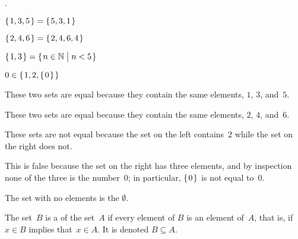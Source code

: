 \documentclass{ibl}
\begin{document}
\begin{ex} \pord.
\begin{exes}
\item $\mbox{$\{\hspace{0.1em}1,3,5\hspace{0.1em}\}$}=\mbox{$\{\hspace{0.1em}5,3,1\hspace{0.1em}\}$}$    
\item $\mbox{$\{\hspace{0.1em}2, 4, 6\hspace{0.1em}\}$}=\mbox{$\{\hspace{0.1em}2, 4, 6, 4\hspace{0.1em}\}$}$    
\item $\mbox{$\{\hspace{0.1em}1, 3\hspace{0.1em}\}$}=\mbox{$\{\hspace{0.1em}n\in\mathbb{N}\bigm| n<5\hspace{0.1em}\}$}$ 
\item $0\in\mbox{$\{\hspace{0.1em}1,2,\mbox{$\{\hspace{0.1em}0\hspace{0.1em}\}$}\hspace{0.1em}\}$}$   
\end{exes}
\begin{ans}
\begin{exes}
\item These two sets are equal because they contain the same elements, $1$, $3$, and~$5$.
\item These two sets are equal because they contain the same elements, $2$, $4$, and~$6$.
\item These sets are not equal because the set on the left contains~$2$
  while the set on the right does not.
\item This is false because the set on the right has three elements, 
  and by inspection none of the three is the number~$0$;
  in particular, $\mbox{$\{\hspace{0.1em}0\hspace{0.1em}\}$}$ is not equal to~$0$.
\end{exes}
\end{ans}
\end{ex}

\begin{df}
The set with no elements is the  $\emptyset$.  
\end{df}

\begin{df}
The set~$B$ is a  of the set~$A$
if every element of $B$ is an element of~$A$,
that is, if $x\in B$ implies that~$x\in A$.
It is denoted $B\subseteq A$.
\end{df}
\end{document}

